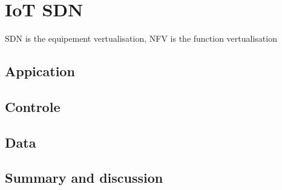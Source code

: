 \section{IoT SDN}

SDN is the equipement vertualisation, NFV is the function vertualisation

\subsection{Appication}
\subsection{Controle}
\subsection{Data}
\subsection{Summary and discussion}
